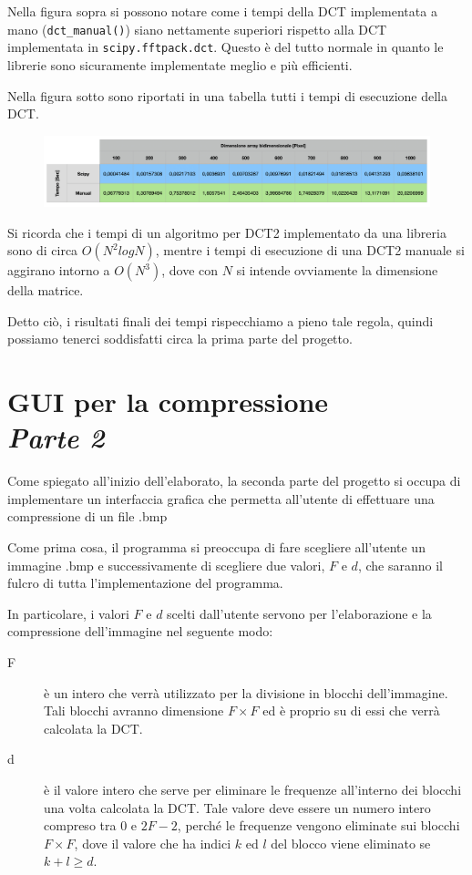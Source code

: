 \documentclass[preprint,12pt]{elsarticle}
\begin{document}
Nella figura sopra si possono notare come i tempi della DCT implementata a mano (\texttt{dct\_manual()}) siano nettamente superiori rispetto alla DCT implementata in \texttt{scipy.fftpack.dct}. Questo è del tutto normale in quanto le librerie sono sicuramente implementate meglio e più efficienti.

Nella figura sotto sono riportati in una tabella tutti i tempi di esecuzione della DCT.

\begin{figure}[H]
	\centering
	\includegraphics[width=\linewidth]{tabella}
\end{figure}

Si ricorda che i tempi di un algoritmo per DCT2 implementato da una libreria sono di circa $O(N^2 logN)$, mentre i tempi di esecuzione di una DCT2 manuale si aggirano intorno a $O(N^3)$, dove con $N$ si intende ovviamente la dimensione della matrice.

Detto ciò, i risultati finali dei tempi rispecchiamo a pieno tale regola, quindi possiamo tenerci soddisfatti circa la prima parte del progetto. 

\newpage

\section*{GUI per la compressione\\ \large{\textit{Parte 2}}}

Come spiegato all'inizio dell'elaborato, la seconda parte del progetto si occupa di implementare un interfaccia grafica che permetta all'utente di effettuare una compressione di un file .bmp

Come prima cosa, il programma si preoccupa di fare scegliere all'utente un immagine .bmp e successivamente di scegliere due valori, $F$ e $d$, che saranno il fulcro di tutta l'implementazione del programma.

In particolare, i valori $F$ e $d$ scelti dall'utente servono per l'elaborazione e la compressione dell'immagine nel seguente modo:
\begin{description}
\item[F] è un intero che verrà utilizzato per la divisione in blocchi dell'immagine. Tali blocchi avranno dimensione $F \times F$ ed è proprio su di essi che verrà calcolata la DCT.
\item[d] è il valore intero che serve per eliminare le frequenze all'interno dei blocchi una volta calcolata la DCT. Tale valore deve essere un numero intero compreso tra $0$ e $2F-2$, perché le frequenze vengono eliminate sui blocchi $F \times F$, dove il valore che ha indici $k$ ed $l$ del blocco viene eliminato se $k + l \geq d$. 
\end{description}
\end{document}
